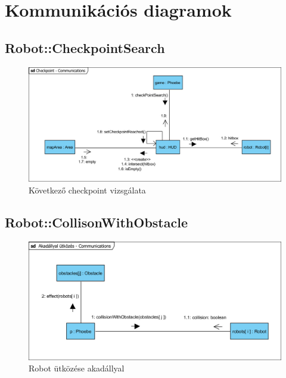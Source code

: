 \section{Kommunikációs diagramok}

\subsection{Robot::CheckpointSearch}
\begin{figure}[h]
\begin{center}
\includegraphics[width=17cm]{images/Commdiagrams/Comm_CheckpointSearch.jpg}
\caption{Következő checkpoint vizsgálata}
\label{fig:example2}
\end{center}
\end{figure}
\pagebreak

\subsection{Robot::CollisonWithObstacle}
\begin{figure}[h]
\begin{center}
\includegraphics[width=17cm]{images/Commdiagrams/Comm_CollisionWithObstacle.jpg}
\caption{Robot ütközése akadállyal}
\label{fig:example4}
\end{center}
\end{figure}
\pagebreak

